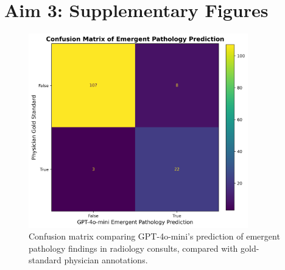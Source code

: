 \section{Aim 3: Supplementary Figures}

\begin{figure}[ht!]
	\centering
	\includegraphics[width=0.85\textwidth] {figures/aim3/imaging_emergent_path_confmat.png}
	\caption{Confusion matrix comparing GPT-4o-mini's prediction of emergent pathology findings in radiology consults, compared with gold-standard physician annotations.} \label{fig:aim3-imaging-path-confmat}
\end{figure}


